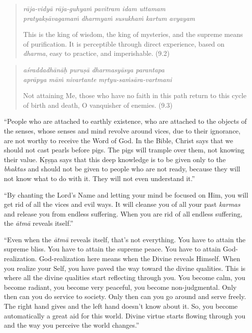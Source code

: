 \documentclass[12pt, twoside, openright]{memoir}
\begin{document}
\par
\begin{verse}
\textit{rāja-vidyā rāja-guhyaṁ pavitram idam uttamam} \\
\textit{pratyakṣāvagamaṁ dharmyaṁ susukhaṁ kartum avyayam}

\noindent This is the king of wisdom, the king of mysteries, and the supreme means of purification. It is perceptible through direct experience, based on \textit{dharma}, easy to practice, and imperishable. (9.2)
\end{verse}
\par



\par
\begin{verse}
\textit{aśraddadhānāḥ puruṣā dharmasyāsya parantapa} \\
\textit{aprāpya māṁ nivartante mṛtyu-saṁsāra-vartmani}

\noindent Not attaining Me, those who have no faith in this path return to this cycle of birth and death, O vanquisher of enemies. (9.3)
\end{verse}
\par


\enquote{People who are attached to earthly existence, who are attached to the objects of the senses, whose senses and mind revolve around vices, due to their ignorance, are not worthy to receive the Word of God. In the Bible, Christ says that we should not cast pearls before pigs. The pigs will trample over them, not knowing their value. Kṛṣṇa says that this deep knowledge is to be given only to the \textit{bhaktas} and should not be given to people who are not ready, because they will not know what to do with it. They will not even understand it.}

\enquote{By chanting the Lord’s Name and letting your mind be focused on Him, you will get rid of all the vices and evil ways. It will cleanse you of all your past \textit{karmas} and release you from endless suffering. When you are rid of all endless suffering, the \textit{ātmā} reveals itself.}

\enquote{Even when the \textit{ātmā} reveals itself, that’s not everything. You have to attain the supreme bliss. You have to attain the supreme peace. You have to attain God-realization. God-realization here means when the Divine reveals Himself. When you realize your Self, you have paved the way toward the divine qualities. This is where all the divine qualities start reflecting through you. You become calm, you become radiant, you become very peaceful, you become non-judgmental. Only then can you do service to society. Only then can you go around and serve freely. The right hand gives and the left hand doesn’t know about it. So, you become automatically a great aid for this world. Divine virtue starts flowing through you and the way you perceive the world changes.}
\end{document}
